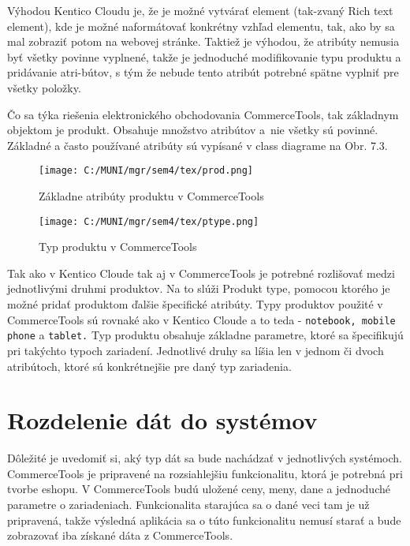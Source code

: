 \documentclass[
  printed, %
  table,   %
  lof,     %
  nolot,     %
  twoside,  
]{fithesis3}
\begin{document}
Výhodou Kentico Cloudu je, že je možné vytvárať element (tak-zvaný Rich text element), kde je možné naformátovať  konkrétny vzhľad elementu, tak, ako by sa mal zobraziť potom na webovej stránke. Taktiež je výhodou, že atribúty nemusia byť všetky povinne vyplnené, takže je jednoduché modifikovanie typu produktu a pridávanie atri-bútov, s tým že nebude tento atribút potrebné spätne vyplniť pre všetky položky.

 Čo sa týka riešenia elektronického obchodovania CommerceTools, tak základnym objektom je produkt. Obsahuje množstvo atribútov a~nie všetky sú povinné. Základné a často používané atribúty sú vypísané v class diagrame na Obr. 7.3. 
 
 
 \begin{figure}[h]
  \begin{center}
        \texttt{[image: C:/MUNI/mgr/sem4/tex/prod.png]}
  \end{center}
  \caption{Základne atribúty produktu v CommerceTools}
  \label{fig:produkt}
\end{figure}

\begin{figure}[h]
  \begin{center}
        \texttt{[image: C:/MUNI/mgr/sem4/tex/ptype.png]}
  \end{center}
  \caption{Typ produktu v CommerceTools}
  \label{fig:produkt type}
\end{figure}

 Tak ako v Kentico Cloude tak aj v CommerceTools je potrebné rozlišovať medzi jednotlivými druhmi produktov. Na to slúži Produkt type, pomocou ktorého je možné pridať produktom ďalšie špecifické atribúty. Typy produktov použité v CommerceTools sú rovnaké ako v Kentico Cloude a to teda - \texttt{notebook, mobile phone} a \texttt{tablet.} Typ produktu obsahuje základne parametre, ktoré sa špecifikujú pri takýchto typoch zariadení. Jednotlivé druhy sa líšia len v jednom či dvoch atribútoch, ktoré sú konkrétnejšie pre daný typ zariadenia.




\section{Rozdelenie dát do systémov}
Dôležité je uvedomiť si, aký typ dát sa bude nachádzať v jednotlivých systémoch. CommerceTools je pripravené na rozsiahlejšiu funkcionalitu, ktorá je potrebná pri tvorbe eshopu. V CommerceTools budú uložené ceny, meny, dane a jednoduché parametre o zariadeniach. Funkcionalita starajúca sa o dané veci tam je už pripravená, takže výsledná aplikácia sa o túto funkcionalitu nemusí starať a bude zobrazovať iba získané dáta z CommerceTools.
\end{document}
